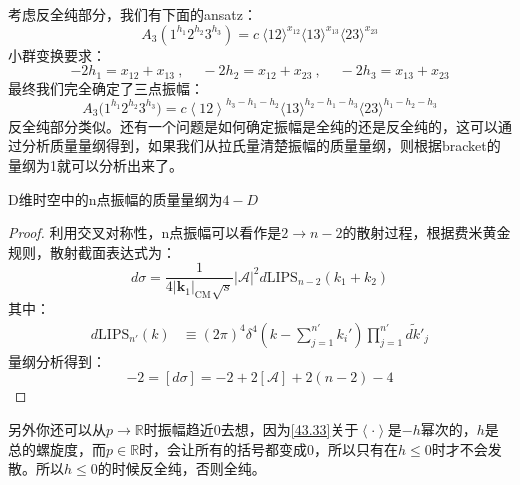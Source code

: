 考虑反全纯部分，我们有下面的ansatz：
\begin{equation}
	A_3{\left(1^{h_1}2^{h_2}3^{h_3}\right)}=c\mathrm{~}\langle12\rangle^{x_{12}}\langle13\rangle^{x_{13}}\langle23\rangle^{x_{23}}
\end{equation}
小群变换要求：
\begin{equation}
	-2h_1=x_{12}+x_{13}\mathrm{~,~}\quad-2h_2=x_{12}+x_{23}\mathrm{~,~}\quad-2h_3=x_{13}+x_{23}
\end{equation}
最终我们完全确定了三点振幅：
\begin{equation}\label{43.33}
	\boxed{
		A_3\big(1^{h_1}2^{h_2}3^{h_3}\big)=c\left<12\right>^{h_3-h_1-h_2}\langle13\rangle^{h_2-h_1-h_3}\langle23\rangle^{h_1-h_2-h_3}
	}
\end{equation}
反全纯部分类似。还有一个问题是如何确定振幅是全纯的还是反全纯的，这可以通过分析质量量纲得到，如果我们从拉氏量清楚振幅的质量量纲，则根据bracket的量纲为1就可以分析出来了。
\begin{theorem}
   D维时空中的n点振幅的质量量纲为$4-D$
\end{theorem}
\begin{proof}
	利用交叉对称性，n点振幅可以看作是$2\to n-2$的散射过程，根据费米黄金规则，散射截面表达式为：
	\begin{equation}
		d\sigma=\frac1{4|\mathbf{k}_1|_\text{CM}{ \sqrt { s }}}|\mathcal{A}|^2d\mathrm{LIPS}_{n-2}(k_1{+}k_2)
	\end{equation}
	其中：
	\begin{equation}
		\begin{aligned}d\text{LIPS}_{n'}(k)&\equiv(2\pi)^4\delta^4(k{-}\sum_{j=1}^{n'}k_i')\prod_{j=1}^{n'}\widetilde{dk'}_j\end{aligned}
	\end{equation}
	量纲分析得到：
	\begin{equation}
		-2=[d\sigma]=-2+2[\mathcal{A}]+2(n-2)-4
	\end{equation}
\end{proof}
另外你还可以从$p\to\mathbb{R}$时振幅趋近0去想，因为\ref{43.33}关于$\left\langle\cdot\right\rangle$是$-h$幂次的，$h$是总的螺旋度，而$p\in\mathbb{R}$时，会让所有的括号都变成0，所以只有在$h\leq 0$时才不会发散。所以$h\leq 0$的时候反全纯，否则全纯。

